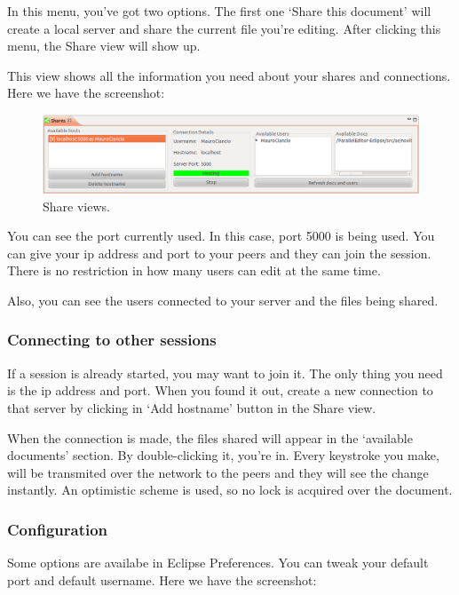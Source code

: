 In this menu, you've got two options. The first one `Share this document' will create a local server 
and share the current file you're editing. After clicking this menu, the Share view will show up.

This view shows all the information you need about your shares and connections. Here we have the screenshot:
\begin{figure}[!ht]
	\begin{center}
		\includegraphics[width=14cm]{share.png}
		\caption{\label{share} Share views.}
	\end{center}
\end{figure}

You can see the port currently used. In this case, port 5000 is being used. You can give your ip address 
and port to your peers and they can join the session. There is no restriction in how many users can 
edit at the same time.

Also, you can see the users connected to your server and the files being shared.

\subsubsection{Connecting to other sessions}
If a session is already started, you may want to join it. The only thing you need is the ip address and port.
 When you found it out, create a new connection to that server by clicking in `Add hostname' button in the 
 Share view.

When the connection is made, the files shared will appear in the `available documents' section. By 
double-clicking it, you're in.
Every keystroke you make, will be transmited over the network to the peers and they will see the change 
instantly. An optimistic scheme is used, so no lock is acquired over the document.

\subsubsection{Configuration}
Some options are availabe in Eclipse Preferences. You can tweak your default port and default username.
Here we have the screenshot:

